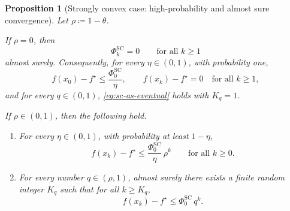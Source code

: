 \documentclass[10pt]{article}
\newtheorem{proposition}[proposition]{Proposition}
\begin{document}
\begin{proposition}[Strongly convex case: high-probability and almost sure convergence]
\label{prop:sc-as}
Let \(\rho\coloneqq 1-\theta\).

If \(\rho=0\), then
\[
\Phi_k^{\mathrm{SC}}=0
\qquad\text{for all }k\ge 1
\]
almost surely. Consequently, for every \(\eta\in(0,1)\), with probability one,
\[
f(x_0)-f^\star\le \frac{\Phi_0^{\mathrm{SC}}}{\eta},
\qquad
f(x_k)-f^\star=0
\quad\text{for all }k\ge 1,
\]
and for every \(q\in(0,1)\), \eqref{eq:sc-as-eventual} holds with \(K_q=1\).

If \(\rho\in(0,1)\), then the following hold.
\begin{enumerate}
\item[(i)] For every \(\eta\in(0,1)\), with probability at least \(1-\eta\),
\begin{equation}
\label{eq:sc-hp-uniform}
f(x_k)-f^\star
\le
\frac{\Phi_0^{\mathrm{SC}}}{\eta}\,\rho^k
\qquad\text{for all }k\ge 0.
\end{equation}

\item[(ii)] For every number \(q\in(\rho,1)\), almost surely there exists a finite random integer \(K_q\) such that for all \(k\ge K_q\),
\begin{equation}
\label{eq:sc-as-eventual}
f(x_k)-f^\star \le \Phi_0^{\mathrm{SC}}\,q^k.
\end{equation}
\end{enumerate}
\end{proposition}
\end{document}
